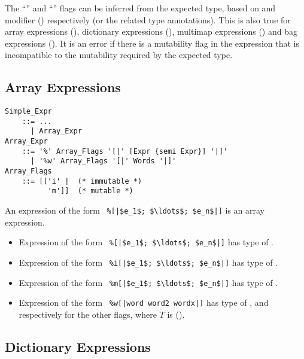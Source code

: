 The ``'' and ``'' flags can be inferred from the expected type, based on  and  modifier () respectively (or the related type annotations). This is also true for array expressions (), dictionary expressions (), multimap expressions () and bag expressions (). It is an error if there is a mutability flag in the expression that is incompatible to the mutability required by the expected type. 





\subsection{Array Expressions}
\label{sec:array-expressions}

\grammar\begin{lstlisting}
Simple_Expr
    ::= ...
      | Array_Expr
Array_Expr
    ::= '%' Array_Flags '[|' [Expr {semi Expr}] '|]'
      | '%w' Array_Flags '[|' Words '|]'
Array_Flags 
    ::= [['i' |  (* immutable *)
          'm']]  (* mutable *)
\end{lstlisting}

An expression of the form ~\lstinline!%[|$e_1$; $\ldots$; $e_n$|]! is an array expression. 

\begin{itemize}
  \item Expression of the form ~\lstinline!%[|$e_1$; $\ldots$; $e_n$|]!
    has type of . 
  \item Expression of the form ~\lstinline!%i[|$e_1$; $\ldots$; $e_n$|]!
    has type of . 
  \item Expression of the form ~\lstinline!%m[|$e_1$; $\ldots$; $e_n$|]!
    has type of .
  \item Expression of the form ~\lstinline!%w[|word word2 wordx|]!
    has type of , and respectively for the other flags, where $T$ is  (). 
\end{itemize}






\subsection{Dictionary Expressions}
\label{sec:dict-expressions}

